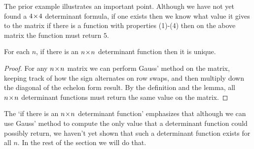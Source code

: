 The prior example illustrates an important point.
Although we have not yet found a $4 \! \times \! 4$ determinant formula,
if one exists then we know what value it gives to the matrix \Dash  
if there is a function with properties (1)-(4) then on the above 
matrix the function must return $5$.

\begin{lemma}
For each $n$, 
if there is an $n \! \times \! n$ determinant function then it is unique.
\end{lemma}

\begin{proof}
For any $n \! \times \! n$ matrix 
we can perform Gauss' method on the 
matrix, keeping track of how the sign alternates on row swaps, and then 
multiply down the diagonal of the echelon form result.
By the definition and the lemma,
all $n \! \times \! n$ determinant functions must return the same value on the matrix.
\end{proof}

The `if there is an $n \! \times \! n$ determinant function' 
emphasizes that
although we can
use Gauss' method to compute the only value that a determinant function 
could possibly return, 
we haven't yet shown that such a determinant function exists for all $n$.
In the rest of the section we will do that.

